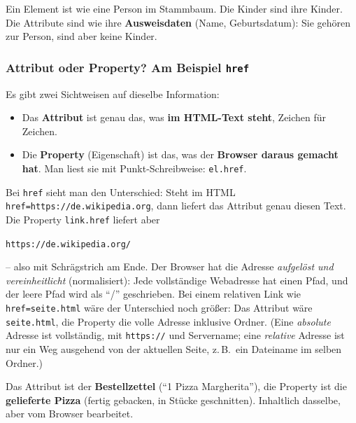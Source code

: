 \documentclass[a4paper,11pt]{article}
\begin{document}
\begin{analogie}
Ein Element ist wie eine Person im Stammbaum. Die Kinder sind ihre Kinder. Die Attribute sind wie ihre
\textbf{Ausweisdaten} (Name, Geburtsdatum): Sie gehören zur Person, sind aber keine Kinder.
\end{analogie}

\subsubsection*{Attribut oder Property? Am Beispiel \texttt{href}}

Es gibt zwei Sichtweisen auf dieselbe Information:
\begin{itemize}[nosep]
\item Das \textbf{Attribut} ist genau das, was \textbf{im HTML-Text steht}, Zeichen für Zeichen.
\item Die \textbf{Property} (Eigenschaft) ist das, was der \textbf{Browser daraus gemacht hat}. Man liest sie mit
      Punkt-Schreibweise: \lstinline|el.href|.
\end{itemize}

Bei \texttt{href} sieht man den Unterschied: Steht im HTML \texttt{href=\textquotedbl{}https://de.wikipedia.org\textquotedbl{}}, dann liefert
das Attribut genau diesen Text. Die Property \lstinline|link.href| liefert aber
\begin{center}\texttt{\textquotedbl{}https://de.wikipedia.org/\textquotedbl{}}\end{center}
-- also mit Schrägstrich am Ende. Der Browser hat die Adresse \emph{aufgelöst und vereinheitlicht} (normalisiert):
Jede vollständige Webadresse hat einen Pfad, und der leere Pfad wird als "`/"' geschrieben.
Bei einem relativen Link wie \texttt{href=\textquotedbl{}seite.html\textquotedbl{}} wäre der Unterschied noch größer: Das Attribut wäre
\texttt{\textquotedbl{}seite.html\textquotedbl{}}, die Property die volle Adresse inklusive Ordner. (Eine
\emph{absolute} Adresse ist vollständig, mit \texttt{https://} und Servername; eine \emph{relative} Adresse ist nur
ein Weg ausgehend von der aktuellen Seite, z.\,B.\ ein Dateiname im selben Ordner.)

\begin{analogie}
Das Attribut ist der \textbf{Bestellzettel} ("`1 Pizza Margherita"'), die Property ist die \textbf{gelieferte Pizza}
(fertig gebacken, in Stücke geschnitten). Inhaltlich dasselbe, aber vom Browser bearbeitet.
\end{analogie}
\end{document}
